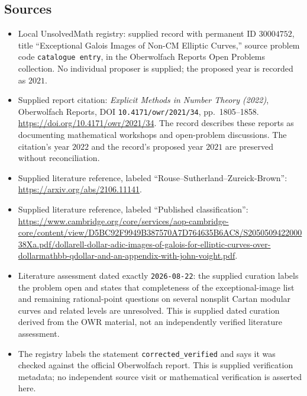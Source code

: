 \documentclass[11pt]{article}
\begin{document}
\subsection{Sources}
\begin{itemize}
\item Local UnsolvedMath registry: supplied record with permanent ID \(30004752\), title ``Exceptional Galois Images of Non-CM Elliptic Curves,'' source problem code \texttt{catalogue entry}, in the Oberwolfach Reports Open Problems collection. No individual proposer is supplied; the proposed year is recorded as \(2021\).
\item Supplied report citation: \emph{Explicit Methods in Number Theory (2022)}, Oberwolfach Reports, DOI \texttt{10.4171/owr/2021/34}, pp.\ 1805--1858. \url{https://doi.org/10.4171/owr/2021/34}. The record describes these reports as documenting mathematical workshops and open-problem discussions. The citation's year \(2022\) and the record's proposed year \(2021\) are preserved without reconciliation.
\item Supplied literature reference, labeled ``Rouse--Sutherland--Zureick-Brown'': \url{https://arxiv.org/abs/2106.11141}.
\item Supplied literature reference, labeled ``Published classification'': \url{https://www.cambridge.org/core/services/aop-cambridge-core/content/view/D5BC92F9949B387570A7D764635B6AC8/S205050942200038Xa.pdf/dollarell-dollar-adic-images-of-galois-for-elliptic-curves-over-dollarmathbb-qdollar-and-an-appendix-with-john-voight.pdf}.
\item Literature assessment dated exactly \texttt{2026-08-22}: the supplied curation labels the problem open and states that completeness of the exceptional-image list and remaining rational-point questions on several nonsplit Cartan modular curves and related levels are unresolved. This is supplied dated curation derived from the OWR material, not an independently verified literature assessment.
\item The registry labels the statement \texttt{corrected\_verified} and says it was checked against the official Oberwolfach report. This is supplied verification metadata; no independent source visit or mathematical verification is asserted here.
\end{itemize}
\end{document}

